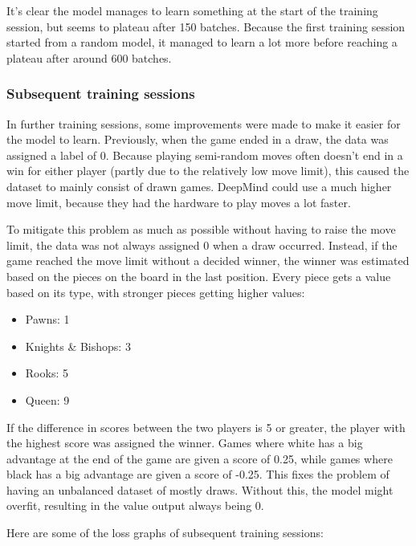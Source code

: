 \documentclass{article}
\begin{document}
It's clear the model manages to learn something at the start of the training session,
but seems to plateau after 150 batches. Because the first training session started from 
a random model, it managed to learn a lot more before reaching a plateau after around 600 batches.

\subsubsection{Subsequent training sessions}

In further training sessions, some improvements were made to make it easier for the model to learn.
Previously, when the game ended in a draw, the data was assigned a label of 0. 
Because playing semi-random moves often doesn't end in a win for either player 
(partly due to the relatively low move limit), this caused the dataset to mainly consist of drawn games. 
DeepMind could use a much higher move limit, because they had the hardware to play moves a lot faster.

To mitigate this problem as much as possible without having to raise the move limit, 
the data was not always assigned 0 when a draw occurred. Instead, if the game reached the move limit
without a decided winner, the winner was estimated based on the pieces on the board in the last position. 
Every piece gets a value based on its type, with stronger pieces getting higher values:

\begin{itemize}
    \item Pawns: 1
    \item Knights \& Bishops: 3
    \item Rooks: 5
    \item Queen: 9
\end{itemize}

If the difference in scores between the two players is 5 or greater, the player with the highest 
score was assigned the winner. Games where white has a big advantage at the end of the game are 
given a score of 0.25, while games where black has a big advantage are given a score of -0.25.
This fixes the problem of having an unbalanced dataset of mostly draws.
Without this, the model might overfit, resulting in the value output always being 0.

Here are some of the loss graphs of subsequent training sessions:
\end{document}

